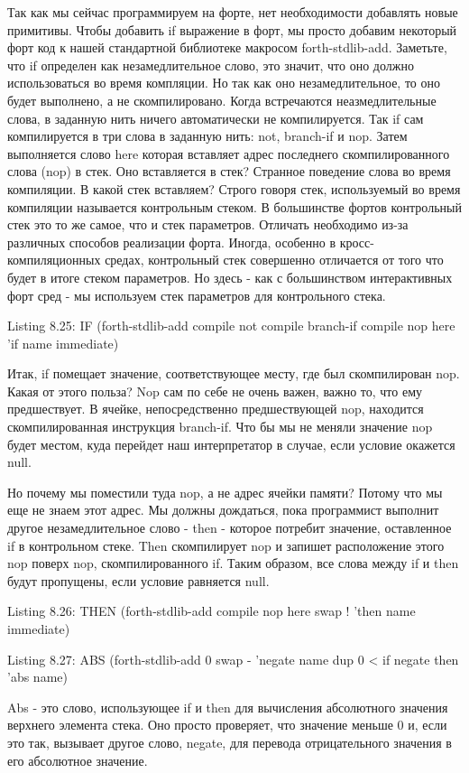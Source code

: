 {{{Так как мы сейчас программируем на форте, нет необходимости добавлять новые примитивы. Чтобы добавить if выражение в форт, мы просто добавим некоторый форт код к нашей стандартной библиотеке макросом forth-stdlib-add. Заметьте, что if определен как незамедлительное слово, это значит, что оно должно использоваться во время компляции. Но так как оно незамедлительное, то оно будет выполнено, а не скомпилировано. Когда встречаются неазмедлительные слова, в заданную нить ничего автоматически не компилируется. Так if сам компилируется в три слова в заданную нить: not, branch-if и nop. Затем выполняется слово here которая вставляет адрес последнего скомпилированного слова (nop) в стек. Оно вставляется в стек? Странное поведение слова во время компиляции. В какой стек вставляем? Строго говоря стек, используемый во время компиляции называется контрольным стеком. В большинстве фортов контрольный стек это то же самое, что и стек параметров. Отличать необходимо из-за различных способов реализации форта. Иногда, особенно в кросс-компиляционных средах, контрольный стек совершенно отличается от того что будет в итоге стеком параметров. Но здесь - как с большинством интерактивных форт сред - мы используем стек параметров для контрольного стека.

Listing 8.25: IF
(forth-stdlib-add
{ compile not
compile branch-if
compile nop
here } ’if name immediate)

Итак, if помещает значение, соответствующее месту, где был скомпилирован nop. Какая от этого польза? Nop сам по себе не очень важен, важно то, что ему предшествует. В ячейке, непосредственно предшествующей nop, находится скомпилированная инструкция branch-if. Что бы мы не меняли значение nop будет местом, куда перейдет наш интерпретатор в случае, если условие окажется null.

Но почему мы поместили туда nop, а не адрес ячейки памяти? Потому что мы еще не знаем этот адрес. Мы должны дождаться, пока программист выполнит другое незамедлительное слово - then - которое потребит значение, оставленное if в контрольном стеке. Then скомпилирует nop и запишет расположение этого nop поверх nop, скомпилированного if. Таким образом, все слова между if и then будут пропущены, если условие равняется null.

Listing 8.26: THEN
(forth-stdlib-add
{ compile nop
here swap ! } ’then name immediate)

Listing 8.27: ABS
(forth-stdlib-add
{ 0 swap - } ’negate name
{ dup 0 < if negate then } ’abs name)

Abs - это слово, использующее if и then для вычисления абсолютного значения верхнего элемента стека. Оно просто проверяет, что значение меньше 0 и, если это так, вызывает другое слово, negate, для перевода отрицательного значения в его абсолютное значение.

}}}

